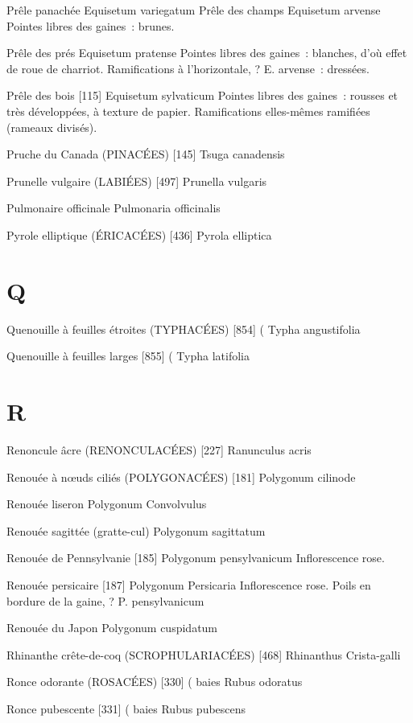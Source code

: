 Prêle panachée
				Equisetum variegatum
Prêle des champs
				Equisetum arvense
Pointes libres des gaines : brunes.

Prêle des prés
				Equisetum pratense
Pointes libres des gaines : blanches, d’où effet de roue de charriot.
Ramifications à l’horizontale, ? E. arvense : dressées.

Prêle des bois  [115]
				Equisetum sylvaticum
Pointes libres des gaines : rousses et très développées, à texture de papier.
Ramifications elles-mêmes ramifiées (rameaux divisés).

Pruche du Canada (PINACÉES)  [145]
				Tsuga canadensis

Prunelle vulgaire (LABIÉES)  [497]
				Prunella vulgaris

Pulmonaire officinale
				Pulmonaria officinalis

Pyrole elliptique (ÉRICACÉES)  [436]
				Pyrola elliptica
\chapter*{Q}

Quenouille à feuilles étroites (TYPHACÉES)  [854]		(
				Typha angustifolia

Quenouille à feuilles larges  [855]					(
				Typha latifolia

\chapter*{R}

Renoncule âcre (RENONCULACÉES)  [227]
				Ranunculus acris

Renouée à nœuds ciliés (POLYGONACÉES)  [181]
				Polygonum cilinode

Renouée liseron
				Polygonum Convolvulus

Renouée sagittée (gratte-cul)
				Polygonum sagittatum


Renouée de Pennsylvanie  [185]
				Polygonum pensylvanicum
Inflorescence rose.

Renouée persicaire  [187]
				Polygonum Persicaria
Inflorescence rose. Poils en bordure de la gaine, ? P. pensylvanicum

Renouée du Japon
				Polygonum cuspidatum

Rhinanthe crête-de-coq (SCROPHULARIACÉES)  [468]
				Rhinanthus Crista-galli

Ronce odorante (ROSACÉES)  [330]			( baies
				Rubus odoratus

Ronce pubescente  [331]					( baies
				Rubus pubescens

